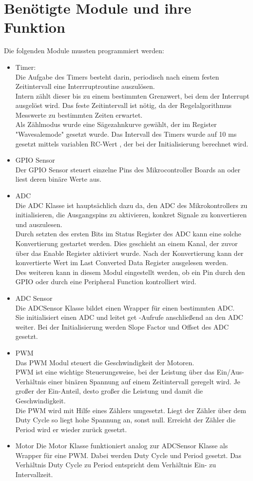 \documentclass[a4paper,10pt,twoside]{report}
\begin{document}
\section{Benötigte Module und ihre Funktion}
Die folgenden Module mussten programmiert werden:
\begin{itemize}
\item Timer:\\
Die Aufgabe des Timers besteht darin, periodisch nach einem festen Zeitintervall eine Interrruptroutine auszulösen.\\ Intern zählt dieser bis zu einem bestimmten Grenzwert, bei dem der Interrupt ausgelöst wird. Das feste Zeitintervall ist nötig, da der Regelalgorithmus Messwerte zu bestimmten Zeiten erwartet.\\
Als Zählmodus wurde eine Sägezahnkurve gewählt, der im Register "Wavesalemode" gesetzt wurde. Das Intervall des Timers wurde auf 10 ms gesetzt mittels variablen RC-Wert , der bei der Initialisierung berechnet wird.
\item GPIO Sensor\\
Der GPIO Sensor steuert einzelne Pins des Mikrocontroller Boards an oder liest deren binäre Werte aus.
\item ADC\\
Die ADC Klasse ist hauptsächlich dazu da, den ADC des Mikrokontrollers zu initialisieren, die Ausgangspins
zu aktivieren, konkret Signale zu konvertieren und auszulesen.\\
Durch setzten des ersten Bits im Status Register des ADC kann eine solche Konvertierung gestartet werden. 
Dies geschieht an einem Kanal, der zuvor über das Enable Register aktiviert wurde. 
Nach der Konvertierung kann der konvertierte Wert im Last Converted Data Register ausgelesen werden.\\
Des weiteren kann in diesem Modul eingestellt werden, ob ein Pin durch den GPIO oder durch
eine Peripheral Function kontrolliert wird.
\item ADC Sensor\\
Die ADCSensor Klasse bildet einen Wrapper für einen bestimmten ADC.\\
Sie initialisiert einen ADC und leitet get -Aufrufe anschließend an den ADC weiter. Bei der Initialisierung werden Slope Factor und Offset des ADC gesetzt.\\
\item PWM\\
Das PWM Modul steuert die Geschwindigkeit der Motoren.\\
PWM ist eine wichtige Steuerungsweise, bei der Leistung über das Ein/Aus-Verhältnis einer binären Spannung auf einem Zeitintervall geregelt wird.
Je großer der Ein-Anteil, desto großer die Leistung und damit die Geschwindigkeit.\\
Die PWM wird mit Hilfe eines Zählers umgesetzt. Liegt der Zähler über dem Duty Cycle so liegt hohe Spannung an, sonst null. Erreicht der Zähler die Period wird er wieder zurück gesetzt.
\item Motor
Die Motor Klasse funktioniert analog zur ADCSensor Klasse als Wrapper für eine PWM.
Dabei werden Duty Cycle und Period gesetzt.
Das Verhältnis Duty Cycle zu Period entspricht dem Verhältnis Ein- zu Intervallzeit.


\end{itemize}
\end{document}
